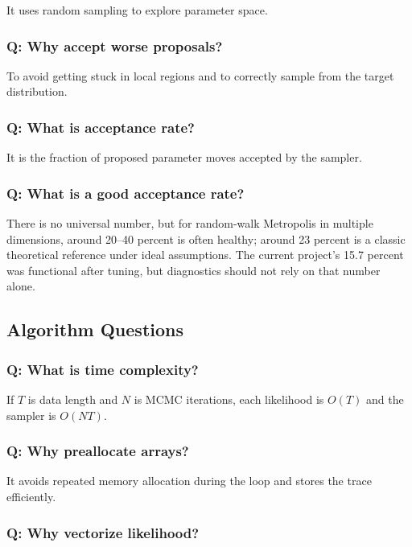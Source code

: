 \documentclass[11pt]{article}
\begin{document}
It uses random sampling to explore parameter space.

\subsubsection{Q: Why accept worse proposals?}

To avoid getting stuck in local regions and to correctly sample from the target
distribution.

\subsubsection{Q: What is acceptance rate?}

It is the fraction of proposed parameter moves accepted by the sampler.

\subsubsection{Q: What is a good acceptance rate?}

There is no universal number, but for random-walk Metropolis in multiple
dimensions, around 20--40 percent is often healthy; around 23 percent is a
classic theoretical reference under ideal assumptions. The current project's
15.7 percent was functional after tuning, but diagnostics should not rely on
that number alone.

\subsection{Algorithm Questions}

\subsubsection{Q: What is time complexity?}

If $T$ is data length and $N$ is MCMC iterations, each likelihood is $O(T)$ and
the sampler is $O(NT)$.

\subsubsection{Q: Why preallocate arrays?}

It avoids repeated memory allocation during the loop and stores the trace
efficiently.

\subsubsection{Q: Why vectorize likelihood?}
\end{document}
